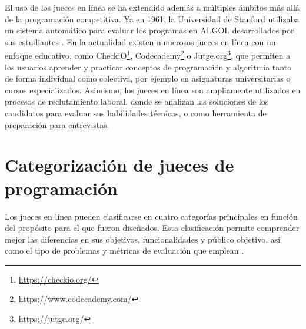 El uso de los jueces en línea se ha extendido además a múltiples ámbitos más allá de la programación competitiva. Ya en 1961, la Universidad de Stanford utilizaba un sistema automático para evaluar los programas en ALGOL desarrollados por sus estudiantes \citep{Forsythe_Wirth_1965}. En la actualidad existen numerosos jueces en línea con un enfoque educativo, como CheckiO\footnote{\url{https://checkio.org/}}, Codecademy\footnote{\url{https://www.codecademy.com/}} o Jutge.org\footnote{\url{https://jutge.org/}}, que permiten a los usuarios aprender y practicar conceptos de programación y algoritmia tanto de forma individual como colectiva, por ejemplo en asignaturas universitarias o cursos especializados. Asimismo, los jueces en línea son ampliamente utilizados en procesos de reclutamiento laboral, donde se analizan las soluciones de los candidatos para evaluar sus habilidades técnicas, o como herramienta de preparación para entrevistas.

\section{Categorización de jueces de programación}

Los jueces en línea pueden clasificarse en cuatro categorías principales en función del propósito para el que fueron diseñados. Esta clasificación permite comprender mejor las diferencias en sus objetivos, funcionalidades y público objetivo, así como el tipo de problemas y métricas de evaluación que emplean \citep{Wasik_Antczak_Badura_Laskowski_Sternal_2019}.

